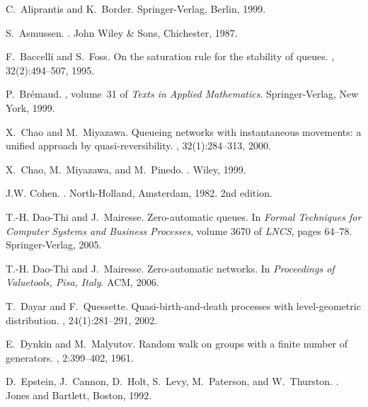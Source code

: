 \documentclass[11pt,a4paper]{article}
\theoremstyle{remark}
\begin{document}
\begin{thebibliography}{10}

C.~Aliprantis and K.~Border.
\newblock Springer-Verlag, Berlin, 1999.

S.~Asmussen.
.
\newblock John Wiley \& Sons, Chichester, 1987.

F.~Baccelli and S.~Foss.
\newblock On the saturation rule for the stability of queues.
, 32(2):494--507, 1995.

P.~Br{\'e}maud.
, volume~31 of {\em Texts in Applied Mathematics}.
\newblock Springer-Verlag, New York, 1999.

X.~Chao and M.~Miyazawa.
\newblock Queueing networks with instantaneous movements: a unified approach by
  quasi-reversibility.
, 32(1):284--313, 2000.

X.~Chao, M.~Miyazawa, and M.~Pinedo.
.
\newblock Wiley, 1999.

J.W. Cohen.
.
\newblock North-Holland, Amsterdam, 1982.
\newblock 2nd edition.

T.-H. Dao-Thi and J.~Mairesse.
\newblock Zero-automatic queues.
\newblock In {\em Formal Techniques for Computer Systems and Business
  Processes}, volume 3670 of {\em LNCS}, pages 64--78. Springer-Verlag, 2005.

T.-H. Dao-Thi and J.~Mairesse.
\newblock Zero-automatic networks.
\newblock In {\em Proceedings of Valuetools, Pisa, Italy}. ACM, 2006.

T.~Dayar and F.~Quessette.
\newblock Quasi-birth-and-death processes with level-geometric distribution.
, 24(1):281--291, 2002.

E.~Dynkin and M.~Malyutov.
\newblock Random walk on groups with a finite number of generators.
, 2:399--402, 1961.

D.~Epstein, J.~Cannon, D.~Holt, S.~Levy, M.~Paterson, and W.~Thurston.
.
\newblock Jones and Bartlett, Boston, 1992.


\end{thebibliography}
\end{document}
